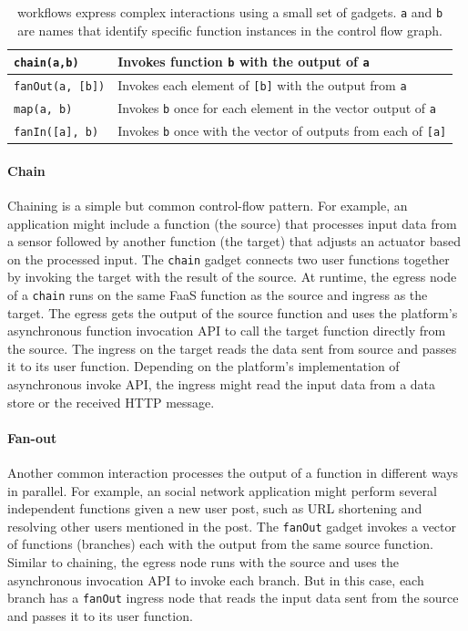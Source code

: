 \begin{table}[t!]
  \centering
  \begin{tabular}{ |m{8em}| m{13em} | }
    \hline
      \texttt{chain(a,b) }& Invokes function \texttt{b} with the output of \texttt{a} \\
    \hline
      \texttt{fanOut(a, [b])} & Invokes each element of \texttt{[b]} with the output from \texttt{a} \\
    \hline
      \texttt{map(a, b)} & Invokes \texttt{b} once for each element in the vector output of \texttt{a} \\
    \hline
      \texttt{fanIn([a], b)} & Invokes \texttt{b} once with the vector of outputs from each of \texttt{[a]} \\
    \hline
\end{tabular}
  \caption{\name{} workflows express complex interactions using a small set of
  gadgets. \texttt{a} and \texttt{b} are names that identify specific function
  instances in the control flow graph.}
  \label{tab:gadgets}
\end{table}


\paragraph{Chain}
Chaining is a simple but common control-flow pattern. For example, an
application might include a function (the source) that processes input data
from a sensor followed by another function (the target) that adjusts an
actuator based on the processed input. The \texttt{chain} gadget connects two
user functions together by invoking the target with the result of the source.
At runtime, the egress node of a \texttt{chain} runs on the same FaaS function
as the source and ingress as the target. The egress gets the output of the
source function and uses the platform's asynchronous function invocation API
to call the target function directly from the source. The ingress on the
target reads the data sent from source and passes it to its user function.
Depending on the platform's implementation of asynchronous invoke API, the
ingress might read the input data from a data store or the received HTTP
message.


\paragraph{Fan-out}
Another common interaction processes the output of a function in different
ways in parallel. For example, an social network application might perform
several independent functions given a new user post, such as URL shortening
and resolving other users mentioned in the post. The \texttt{fanOut} gadget
invokes a vector of functions (branches) each with the output from the same
source function. Similar to chaining, the egress node runs with the source and
uses the asynchronous invocation API to invoke each branch. But in this case,
each branch has a \texttt{fanOut} ingress node that reads the input data sent
from the source and passes it to its user function.

